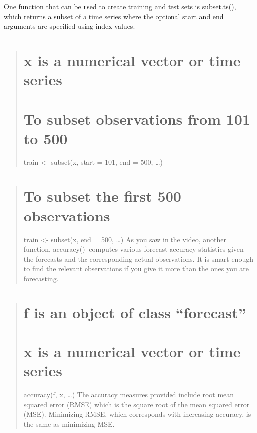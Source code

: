 \documentclass[
  letterpaper,
  DIV=11,
  numbers=noendperiod]{scrartcl}
\begin{document}
One function that can be used to create training and test sets is
subset.ts(), which returns a subset of a time series where the optional
start and end arguments are specified using index values.

\begin{quote}
\hypertarget{x-is-a-numerical-vector-or-time-series}{%
\section{x is a numerical vector or time
series}\label{x-is-a-numerical-vector-or-time-series}}

\hypertarget{to-subset-observations-from-101-to-500}{%
\section{To subset observations from 101 to
500}\label{to-subset-observations-from-101-to-500}}

train \textless- subset(x, start = 101, end = 500, \ldots)
\end{quote}

\begin{quote}
\hypertarget{to-subset-the-first-500-observations}{%
\section{To subset the first 500
observations}\label{to-subset-the-first-500-observations}}

train \textless- subset(x, end = 500, \ldots) As you saw in the video,
another function, accuracy(), computes various forecast accuracy
statistics given the forecasts and the corresponding actual
observations. It is smart enough to find the relevant observations if
you give it more than the ones you are forecasting.
\end{quote}

\begin{quote}
\hypertarget{f-is-an-object-of-class-forecast}{%
\section{f is an object of class
``forecast''}\label{f-is-an-object-of-class-forecast}}

\hypertarget{x-is-a-numerical-vector-or-time-series-1}{%
\section{x is a numerical vector or time
series}\label{x-is-a-numerical-vector-or-time-series-1}}

accuracy(f, x, \ldots) The accuracy measures provided include root mean
squared error (RMSE) which is the square root of the mean squared error
(MSE). Minimizing RMSE, which corresponds with increasing accuracy, is
the same as minimizing MSE.
\end{quote}
\end{document}
